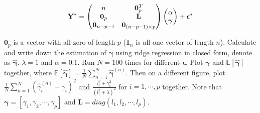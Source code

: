\documentclass[11pt]{article}
\newcommand{\Lmat}[0]{{{\bf L}}}
\newcommand{\Ymat}{{\bf Y}}
\newcommand{\epsilonv}{\boldsymbol{\epsilon}}
\begin{document}
\begin{eqnarray*}
\Ymat^* = 
\begin{pmatrix}
n & \bm 0_p^T \\
\bm 0_{p} &  \Lmat \\
\bm 0_{n-p-1}  & \bm 0_{(n-p-1)\times p}
\end{pmatrix}
\begin{pmatrix}
\alpha \\
\bm \gamma
\end{pmatrix}
+ \epsilonv^*
\end{eqnarray*}

$\bm 0_p$ is a vector with all zero of length $p$ ($\bm 1_n$ is all one vector of length $n$). Calculate and write down the estimation of $\bm \gamma$ using ridge regression in closed form, denote as $\hat{\bm \gamma}$. $\lambda = 1$ and $\alpha = 0.1$. Run $N = 100$ times for different $\epsilonv$. Plot $\bm \gamma$ and $\mathbb{E}[\hat{\bm \gamma}]$ together, where $\mathbb{E}[\hat{\bm \gamma}] = \frac{1}{N} \sum_{n=1}^N \hat{\bm \gamma}^{(n)}$. Then on a different figure, plot $\frac{1}{N}\sum_{n=1}^N ( \hat{\gamma}_i^{(n)} - \gamma_i)^2$ and $\frac{l_i^2 + \gamma_i^2}{(l_i^2 + \lambda)^2}$ for $i=1,\cdots,p$ together. Note that $\bm \gamma = [\gamma_1, \gamma_2,\cdots, \gamma_p]$ and $\bm L = diag(l_1,l_2,\cdots,l_p)$.
\end{document}
